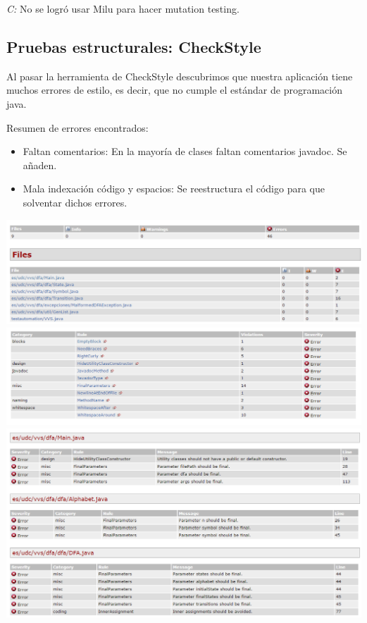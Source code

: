 \documentclass[DIV=calc,paper=a4,fontsize=11pt,onecolumn]{scrartcl} %
\begin{document}
\textit{C:} No se logró usar Milu para hacer mutation testing.

\subsection{Pruebas estructurales: CheckStyle}
	Al pasar la herramienta de CheckStyle descubrimos que nuestra aplicación tiene muchos errores de estilo, es decir, que no cumple el estándar de programación java.
	
	Resumen de errores encontrados:
	\begin{itemize}
		\item Faltan comentarios: En la mayoría de clases faltan comentarios javadoc. Se añaden.
		\item Mala indexación código y espacios: Se reestructura el código para que solventar dichos errores.
	\end{itemize}
	\includegraphics[width=15cm]{Imagenes/erroresCheckStyle.png} \\
	\includegraphics[width=15cm]{Imagenes/checkStyleErrores.png} \\
	\includegraphics[width=15cm]{Imagenes/checkStyleErrores1.png} \\
\end{document}
